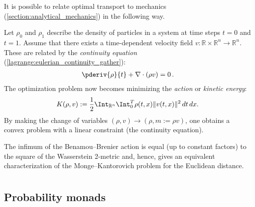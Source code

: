     It is possible to relate optimal transport to mechanics (\cref{section:analytical_mechanics}) in the following way.
    \begin{method}
        Let $\rho_0$ and $\rho_1$ describe the density of particles in a system at time steps $t=0$ and $t=1$. Assume that there exists a time-dependent velocity field $v:\mathbb{R}\times\mathbb{R}^n\rightarrow\mathbb{R}^n$. These are related by the \textit{continuity equation} (\cref{lagrange:eulerian_continuity_gather}):
        \begin{gather}
            \pderiv{\rho}{t} + \nabla\cdot(\rho v) = 0\,.
        \end{gather}
        The optimization problem now becomes minimizing the \textit{action} or \textit{kinetic energy}:
        \begin{gather}
            K(\rho,v) := \frac{1}{2}\Int_{\mathbb{R}^n}\Int_0^T\rho(t,x)\|v(t,x)\|^2\,dt\,dx.
        \end{gather}
        By making the change of variables $(\rho,v)\longrightarrow(\rho,m:=\rho v)$, one obtains a convex problem with a linear constraint (the continuity equation).
    \end{method}
    \begin{property}
        The infimum of the Benamou--Brenier action is equal (up to constant factors) to the square of the Wasserstein 2-metric and, hence, gives an equivalent characterization of the Monge--Kantorovich problem for the Euclidean distance.
    \end{property}

\section{}
\subsection{Probability monads}

